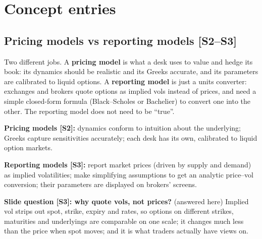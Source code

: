 \documentclass[10pt]{article}
\begin{document}
\section{Concept entries}

\subsection{Pricing models vs reporting models [S2--S3]}
\begin{idea}
Two different jobs. A \textbf{pricing model} is what a desk uses to value and hedge its book: its dynamics should be realistic and its Greeks accurate, and its parameters are calibrated to liquid options. A \textbf{reporting model} is just a units converter: exchanges and brokers quote options as implied vols instead of prices, and need a simple closed-form formula (Black--Scholes or Bachelier) to convert one into the other. The reporting model does not need to be ``true''.
\end{idea}
\textbf{Pricing models [S2]:} dynamics conform to intuition about the underlying; Greeks capture sensitivities accurately; each desk has its own, calibrated to liquid option markets.

\textbf{Reporting models [S3]:} report market prices (driven by supply and demand) as implied volatilities; make simplifying assumptions to get an analytic price--vol conversion; their parameters are displayed on brokers' screens.

\textbf{Slide question [S3]: why quote vols, not prices?} (answered here) Implied vol strips out spot, strike, expiry and rates, so options on different strikes, maturities and underlyings are comparable on one scale; it changes much less than the price when spot moves; and it is what traders actually have views on.
\end{document}
